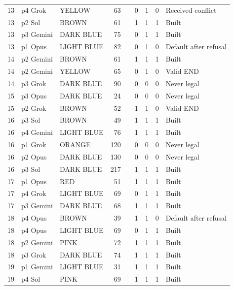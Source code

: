\begin{longtable}{r l l r l r r r L{1.45in}}
13 & p4 Grok & YELLOW & 63 &  & 0 & 1 & 0 & Received conflict \\
13 & p2 Sol & BROWN & 61 &  & 1 & 1 & 1 & Built \\
13 & p3 Gemini & DARK BLUE & 75 &  & 0 & 1 & 1 & Built \\
13 & p1 Opus & LIGHT BLUE & 82 &  & 0 & 1 & 0 & Default after refusal \\
14 & p2 Gemini & BROWN & 61 &  & 1 & 1 & 1 & Built \\
14 & p2 Gemini & YELLOW & 65 &  & 0 & 1 & 0 & Valid END \\
14 & p3 Grok & DARK BLUE & 90 &  & 0 & 0 & 0 & Never legal \\
15 & p3 Opus & DARK BLUE & 24 &  & 0 & 0 & 0 & Never legal \\
15 & p2 Grok & BROWN & 52 &  & 1 & 1 & 0 & Valid END \\
16 & p3 Sol & BROWN & 49 &  & 1 & 1 & 1 & Built \\
16 & p4 Gemini & LIGHT BLUE & 76 &  & 1 & 1 & 1 & Built \\
16 & p1 Grok & ORANGE & 120 &  & 0 & 0 & 0 & Never legal \\
16 & p2 Opus & DARK BLUE & 130 &  & 0 & 0 & 0 & Never legal \\
16 & p3 Sol & DARK BLUE & 217 &  & 1 & 1 & 1 & Built \\
17 & p1 Opus & RED & 51 &  & 1 & 1 & 1 & Built \\
17 & p4 Grok & LIGHT BLUE & 69 &  & 0 & 1 & 1 & Built \\
17 & p3 Gemini & DARK BLUE & 68 &  & 1 & 1 & 1 & Built \\
18 & p4 Opus & BROWN & 39 &  & 1 & 1 & 0 & Default after refusal \\
18 & p4 Opus & LIGHT BLUE & 69 &  & 0 & 1 & 1 & Built \\
18 & p2 Gemini & PINK & 72 &  & 1 & 1 & 1 & Built \\
18 & p3 Grok & DARK BLUE & 74 &  & 1 & 1 & 1 & Built \\
19 & p1 Gemini & LIGHT BLUE & 31 &  & 1 & 1 & 1 & Built \\
19 & p4 Sol & PINK & 69 &  & 1 & 1 & 1 & Built \\

\end{longtable}
